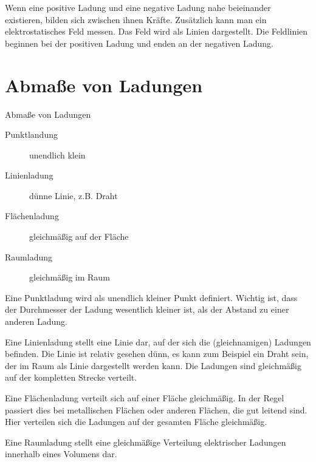 \documentclass[a4paper, 10pt]{scrartcl}
\begin{document}
Wenn eine positive Ladung und eine negative Ladung nahe beieinander existieren, bilden sich zwischen ihnen Kräfte. Zusätzlich kann man ein elektrostatisches Feld messen. Das Feld wird als Linien dargestellt. Die Feldlinien beginnen bei der positiven Ladung und enden an der negativen Ladung.

\section[Ladungen]{Abmaße von Ladungen}

\begin{frame}{Abmaße von Ladungen}
  \begin{description}
    \item[Punktlandung] unendlich klein
    \item[Linienladung] dünne Linie, z.B. Draht
    \item[Flächenladung] gleichmäßig auf der Fläche
    \item[Raumladung] gleichmäßig im Raum
  \end{description}
\end{frame}
Eine Punktladung wird als unendlich kleiner Punkt definiert. Wichtig ist, dass der Durchmesser der Ladung wesentlich kleiner ist, als der Abstand zu einer anderen Ladung.

Eine Linienladung stellt eine Linie dar, auf der sich die (gleichnamigen) Ladungen befinden. Die Linie ist relativ gesehen dünn, es kann zum Beispiel ein Draht sein, der im Raum als Linie dargestellt werden kann. Die Ladungen sind gleichmäßig auf der kompletten Strecke verteilt.

Eine Flächenladung verteilt sich auf einer Fläche gleichmäßig. In der Regel passiert dies bei metallischen Flächen oder anderen Flächen, die gut leitend sind. Hier verteilen sich die Ladungen auf der gesamten Fläche gleichmäßig.

Eine Raumladung stellt eine gleichmäßige Verteilung elektrischer Ladungen innerhalb eines Volumens dar.
\end{document}
